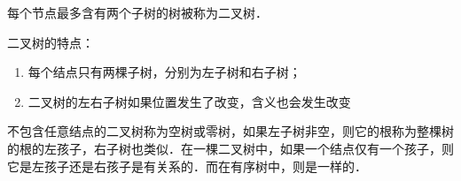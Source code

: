 
每个节点最多含有两个子树的树被称为二叉树．

二叉树的特点：

\begin{enumerate}
\item 每个结点只有两棵子树，分别为左子树和右子树；
\item 二叉树的左右子树如果位置发生了改变，含义也会发生改变
\end{enumerate}

不包含任意结点的二叉树称为空树或零树，如果左子树非空，则它的根称为整棵树的根的左孩子，右子树也类似．在一棵二叉树中，如果一个结点仅有一个孩子，则它是左孩子还是右孩子是有关系的．而在有序树中，则是一样的．

